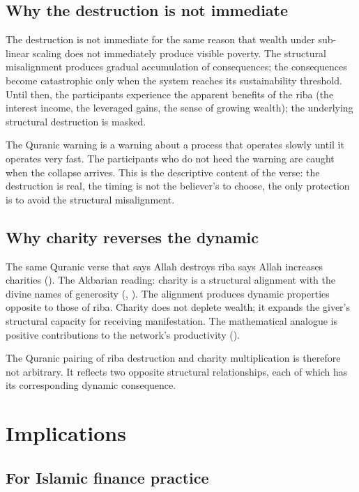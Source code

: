 \subsection{Why the destruction is not immediate}

The destruction is not immediate for the same reason that wealth
under sub-linear scaling does not immediately produce visible
poverty. The structural misalignment produces gradual accumulation
of consequences; the consequences become catastrophic only when
the system reaches its sustainability threshold. Until then, the
participants experience the apparent benefits of the riba (the
interest income, the leveraged gains, the sense of growing wealth);
the underlying structural destruction is masked.

The Quranic warning is a warning about a process that operates
slowly until it operates very fast. The participants who do not
heed the warning are caught when the collapse arrives. This is the
descriptive content of the verse: the destruction is real, the
timing is not the believer's to choose, the only protection is to
avoid the structural misalignment.

\subsection{Why charity reverses the dynamic}

The same Quranic verse that says Allah destroys riba says Allah
increases charities (). The Akbarian reading: charity
is a structural alignment with the divine names of generosity
(, ). The alignment produces dynamic
properties opposite to those of riba. Charity does not deplete
wealth; it expands the giver's structural capacity for receiving
manifestation. The mathematical analogue is positive contributions
to the network's productivity ().

The Quranic pairing of riba destruction and charity multiplication
is therefore not arbitrary. It reflects two opposite structural
relationships, each of which has its corresponding dynamic
consequence.

\section{Implications}
\label{sec:riba-implications}

\subsection{For Islamic finance practice}

